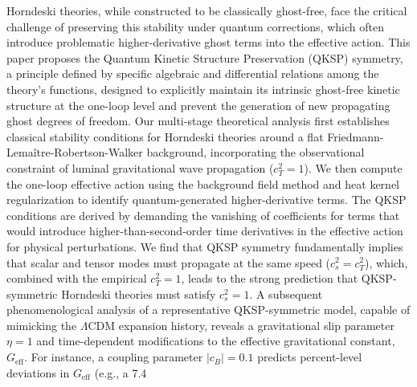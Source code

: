 \documentclass[twocolumn]{aastex631}
\begin{document}
Horndeski theories, while constructed to be classically ghost-free, face the critical challenge of preserving this stability under quantum corrections, which often introduce problematic higher-derivative ghost terms into the effective action. This paper proposes the Quantum Kinetic Structure Preservation (QKSP) symmetry, a principle defined by specific algebraic and differential relations among the theory's functions, designed to explicitly maintain its intrinsic ghost-free kinetic structure at the one-loop level and prevent the generation of new propagating ghost degrees of freedom. Our multi-stage theoretical analysis first establishes classical stability conditions for Horndeski theories around a flat Friedmann-Lemaître-Robertson-Walker background, incorporating the observational constraint of luminal gravitational wave propagation ($c_T^2=1$). We then compute the one-loop effective action using the background field method and heat kernel regularization to identify quantum-generated higher-derivative terms. The QKSP conditions are derived by demanding the vanishing of coefficients for terms that would introduce higher-than-second-order time derivatives in the effective action for physical perturbations. We find that QKSP symmetry fundamentally implies that scalar and tensor modes must propagate at the same speed ($c_s^2 = c_T^2$), which, combined with the empirical $c_T^2=1$, leads to the strong prediction that QKSP-symmetric Horndeski theories must satisfy $c_s^2=1$. A subsequent phenomenological analysis of a representative QKSP-symmetric model, capable of mimicking the $\Lambda$CDM expansion history, reveals a gravitational slip parameter $\eta=1$ and time-dependent modifications to the effective gravitational constant, $G_{\text{eff}}$. For instance, a coupling parameter $|c_B|=0.1$ predicts percent-level deviations in $G_{\text{eff}}$ (e.g., a 7.4%
\end{document}
